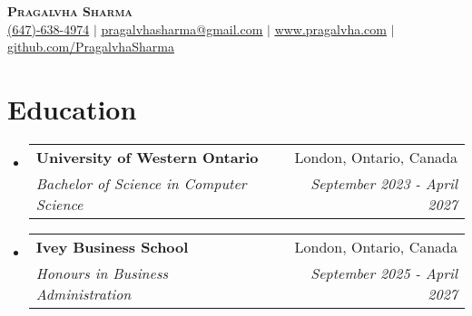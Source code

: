 \documentclass[letterpaper,10pt]{article}
\makeatletter
\newcommand{\resumeSubheading}[4]{
  \vspace{-2pt}\item
    \begin{tabular*}{0.97\textwidth}[t]{l@{\extracolsep{\fill}}r}
      \textbf{#1} & #2 \\
      \textit{\small#3} & \textit{\small #4} \\
    \end{tabular*}\vspace{-7pt}
}
\newcommand{\resumeSubHeadingListStart}{\begin{itemize}[leftmargin=0.15in, label={}]}
\newcommand{\resumeSubHeadingListEnd}{\end{itemize}}
\makeatother
\begin{document}

\begin{center}
    \textbf{\Huge \scshape Pragalvha Sharma} \\ \vspace{1pt}
    \small{
    \href{tel:+16476384974}{(647)-638-4974} $|$
    \href{mailto:pragalvhasharma@gmail.com}{\underline{pragalvhasharma@gmail.com}} $|$
    \href{https://www.pragalvha.com}{\underline{www.pragalvha.com}} $|$
    \href{https://github.com/PragalvhaSharma}{\underline{github.com/PragalvhaSharma}}
    }
\end{center}


\section{Education}
\resumeSubHeadingListStart
  \resumeSubheading
    {University of Western Ontario}{London, Ontario, Canada}
    {Bachelor of Science in Computer Science}{September 2023 - April 2027}
  \resumeSubheading
    {Ivey Business School}{London, Ontario, Canada}
    {Honours in Business Administration}{September 2025 - April 2027}
\resumeSubHeadingListEnd

\end{document}
